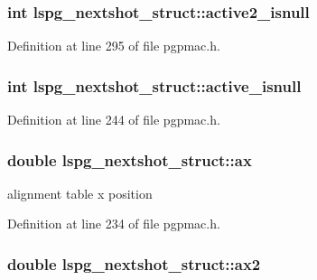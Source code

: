 \hypertarget{structlspg__nextshot__struct_a1aa11ff4a4c8d69695786b4349e84e6b}{
\subsubsection[{active2\-\_\-isnull}]{\setlength{\rightskip}{0pt plus 5cm}int lspg\-\_\-nextshot\-\_\-struct\-::active2\-\_\-isnull}}\label{structlspg__nextshot__struct_a1aa11ff4a4c8d69695786b4349e84e6b}


Definition at line 295 of file pgpmac.\-h.

\hypertarget{structlspg__nextshot__struct_a9f777671ec617a0f533b3c51f28babb3}{
\subsubsection[{active\-\_\-isnull}]{\setlength{\rightskip}{0pt plus 5cm}int lspg\-\_\-nextshot\-\_\-struct\-::active\-\_\-isnull}}\label{structlspg__nextshot__struct_a9f777671ec617a0f533b3c51f28babb3}


Definition at line 244 of file pgpmac.\-h.

\hypertarget{structlspg__nextshot__struct_a7f57874223897ab7d9c7531a9522904d}{
\subsubsection[{ax}]{\setlength{\rightskip}{0pt plus 5cm}double lspg\-\_\-nextshot\-\_\-struct\-::ax}}\label{structlspg__nextshot__struct_a7f57874223897ab7d9c7531a9522904d}


alignment table x position 



Definition at line 234 of file pgpmac.\-h.

\hypertarget{structlspg__nextshot__struct_ab76bd38d2a098bc7eda82aff5dcb9c66}{
\subsubsection[{ax2}]{\setlength{\rightskip}{0pt plus 5cm}double lspg\-\_\-nextshot\-\_\-struct\-::ax2}}\label{structlspg__nextshot__struct_ab76bd38d2a098bc7eda82aff5dcb9c66}


